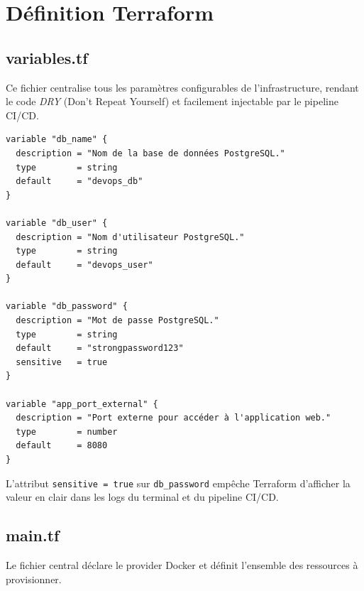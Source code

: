 \documentclass[12pt,a4paper]{report}
\begin{document}
\section{Définition Terraform}

\subsection{variables.tf}

Ce fichier centralise tous les paramètres configurables de l'infrastructure,
rendant le code \textit{DRY} (Don't Repeat Yourself) et facilement injectable
par le pipeline CI/CD.

\begin{lstlisting}[style=terraform, caption={variables.tf --- Paramètres configurables}]
variable "db_name" {
  description = "Nom de la base de données PostgreSQL."
  type        = string
  default     = "devops_db"
}

variable "db_user" {
  description = "Nom d'utilisateur PostgreSQL."
  type        = string
  default     = "devops_user"
}

variable "db_password" {
  description = "Mot de passe PostgreSQL."
  type        = string
  default     = "strongpassword123"
  sensitive   = true
}

variable "app_port_external" {
  description = "Port externe pour accéder à l'application web."
  type        = number
  default     = 8080
}
\end{lstlisting}

L'attribut \texttt{sensitive = true} sur \texttt{db\_password} empêche Terraform
d'afficher la valeur en clair dans les logs du terminal et du pipeline CI/CD.

\subsection{main.tf}

Le fichier central déclare le provider Docker et définit l'ensemble des ressources
à provisionner.
\end{document}
